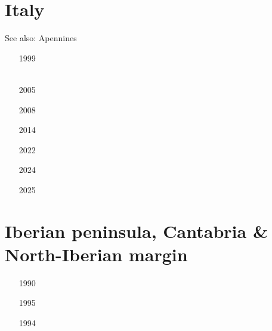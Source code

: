 
\section{Italy}
See also: Apennines

\begin{small}
\begin{itemize}
\item[1999]  \\  \\ 
\item[2005] 
\item[2008] 
\item[2014] 
\item[2022] 
\item[2024]  \\ 
\item[2025] 
\end{itemize}
\end{small}

\section{Iberian peninsula, Cantabria \& North-Iberian margin}

\begin{small}
\begin{itemize}
\item[1990]
\item[1995]
\item[1994]
\item[\nineteenninetysix]
\item[\twothousandtwo]
\item[\twothousandfour]
 \\
\item[\twothousandeleven]
\item[\twothousandfifteen]
 \\
 \\
\item[\twothousandtwentyone]
\item[\twothousandtwentythree]
\end{itemize}
\end{small}

